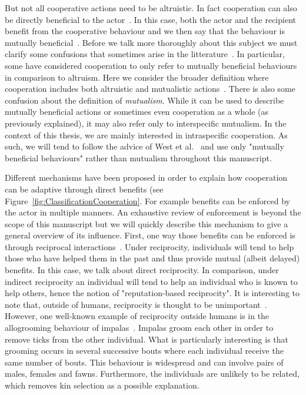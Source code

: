     But not all cooperative actions need to be altruistic. In fact cooperation can also be directly beneficial to the actor~\parencite{Leimar2010}. In this case, both the actor and the recipient benefit from the cooperative behaviour and we then say that the behaviour is mutually beneficial~\parencite{West2007a}. Before we talk more thoroughly about this subject we must clarify some confusions that sometimes arise in the litterature~\parencite{Bergmuller2007a}. In particular, some have considered cooperation to only refer to mutually beneficial behaviours~\parencite{Trivers1985, Lehmann2006} in comparison to altruism. Here we consider the broader definition where cooperation includes both altruistic and mutualistic actions~\parencite{West2007a}. There is also some confusion about the definition of \emph{mutualism}. While it can be used to describe mutually beneficial actions or sometimes even cooperation as a whole (as previously explained), it may also refer only to interspecific mutualism. In the context of this thesis, we are mainly interested in intraspecific cooperation. As such, we will tend to follow the advice of West et al.~\parencite{West2007} and use only "mutually beneficial behaviours" rather than mutualism throughout this manuscript.

    Different mechanisms have been proposed in order to explain how cooperation can be adaptive through direct benefits (see Figure~\ref{fig:ClassificationCooperation}. For example benefits can be enforced by the actor in multiple manners. An exhaustive review of enforcement is beyond the scope of this manuscript but we will quickly describe this mechanism to give a general overview of its influence. First, one way those benefits can be enforced is through reciprocal interactions~\parencite{Trivers1971}. Under reciprocity, individuals will tend to help those who have helped them in the past and thus provide mutual (albeit delayed) benefits. In this case, we talk about direct reciprocity. In comparison, under indirect reciprocity an individual will tend to help an individual who is known to help others, hence the notion of "reputation-based reciprocity". It is interesting to note that, outside of humans, reciprocity is thought to be unimportant~\parencite{Dugatkin1997}. However, one well-known example of reciprocity outside humans is in the allogrooming behaviour of impalas~\parencite{Hart1992}. Impalas groom each other in order to remove ticks from the other individual. What is particularly interesting is that grooming occurs in several successive bouts where each individual receive the same number of bouts. This behaviour is widespread and can involve pairs of males, females and fawns. Furthermore, the individuals are unlikely to be related, which removes kin selection as a possible explanation.

